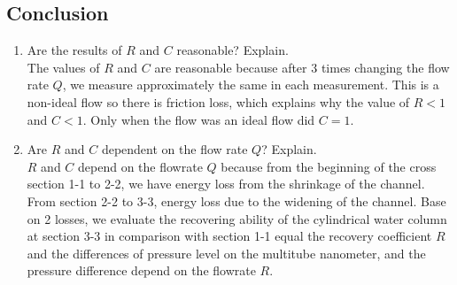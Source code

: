 \subsection{Conclusion}
\begin{enumerate}[label=\alph*)]
	\item Are the results of $R$ and $C$ reasonable? Explain.\\
	The values of $R$ and $C$ are reasonable because after 3 times changing the flow rate $Q$, we measure approximately the same in each measurement. This is a non-ideal flow so there is friction loss, which explains why the value of $R<1$ and $C<1$. Only when the flow was an ideal flow did $C =1$.
	\item Are $R$ and $C$ dependent on the flow rate $Q$? Explain.\\
	$R$ and $C$ depend on the flowrate $Q$ because from the beginning of the cross section 1-1 to 2-2, we have energy loss from the shrinkage of the channel. From section 2-2 to 3-3, energy loss due to the widening of the channel. Base on 2 losses, we evaluate the recovering ability of the cylindrical water column at section 3-3 in comparison with section 1-1 equal the recovery coefficient $R$ and the differences of pressure level on the multitube nanometer, and the pressure difference depend on the flowrate $R$.
\end{enumerate}